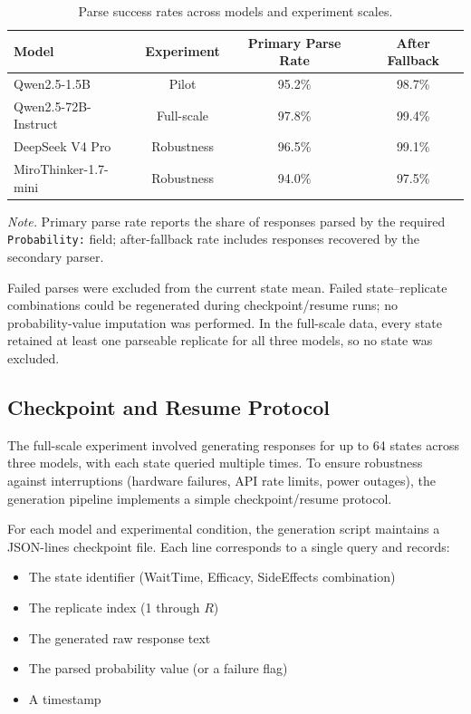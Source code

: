 \documentclass[11pt]{article}
\begin{document}
\begin{table}[htbp]
\centering
\caption{Parse success rates across models and experiment scales.}
\label{tab:S9}
\begin{tabular}{lccc}
\toprule
\textbf{Model} & \textbf{Experiment} & \textbf{Primary Parse Rate} & \textbf{After Fallback} \\
\midrule
Qwen2.5-1.5B  & Pilot         & 95.2\% & 98.7\% \\
Qwen2.5-72B-Instruct   & Full-scale    & 97.8\% & 99.4\% \\
DeepSeek V4 Pro & Robustness  & 96.5\% & 99.1\% \\
MiroThinker-1.7-mini & Robustness & 94.0\% & 97.5\% \\
\bottomrule
\end{tabular}
\end{table}

\textit{Note.} Primary parse rate reports the share of responses parsed by the required \texttt{Probability:} field; after-fallback rate includes responses recovered by the secondary parser.

Failed parses were excluded from the current state mean. Failed state--replicate combinations could be regenerated during checkpoint/resume runs; no probability-value imputation was performed. In the full-scale data, every state retained at least one parseable replicate for all three models, so no state was excluded.

\subsection{Checkpoint and Resume Protocol}
\label{app:checkpoint}

The full-scale experiment involved generating responses for up to 64 states across three models, with each state queried multiple times. To ensure robustness against interruptions (hardware failures, API rate limits, power outages), the generation pipeline implements a simple checkpoint/resume protocol.

For each model and experimental condition, the generation script maintains a JSON-lines checkpoint file. Each line corresponds to a single query and records:

\begin{itemize}
    \item The state identifier (WaitTime, Efficacy, SideEffects combination)
    \item The replicate index (1 through $R$)
    \item The generated raw response text
    \item The parsed probability value (or a failure flag)
    \item A timestamp
\end{itemize}
\end{document}
